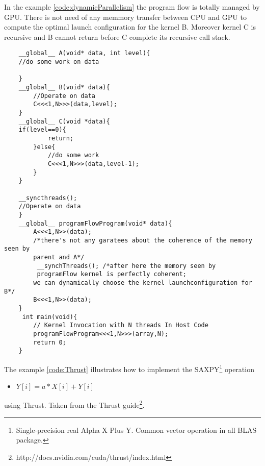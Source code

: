  In the example \ref{code:dynamicParallelism} the program flow is totally
 managed by GPU. There is not need of any memmory transfer between CPU and GPU
 to compute the optimal launch configuration for the kernel B.
 Moreover kernel C is  recursive and B cannot return before C complete
 its recursive call stack.
    \begin{lstlisting}
	__global__ A(void* data, int level){
	//do some work on data
		
	}
	__global__ B(void* data){
		//Operate on data
		C<<<1,N>>>(data,level);
	}
	__global__ C(void *data){
	if(level==0){
			return;
		}else{
			//do some work
			C<<<1,N>>>(data,level-1);
		}
	}
	
	__syncthreads();
	//Operate on data
	}
	__global__ programFlowProgram(void* data){
		A<<<1,N>>(data);
		/*there's not any garatees about the coherence of the memory seen by
		parent and A*/
		 __synchThreads(); /*after here the memory seen by
		 programFlow kernel is perfectly coherent;
		we can dynamically choose the kernel launchconfiguration for B*/
		B<<<1,N>>(data);
	}
	 int main(void){
		// Kernel Invocation with N threads In Host Code
    	programFlowProgram<<<1,N>>>(array,N);
    	return 0;
   	}
    \end{lstlisting} 
    
    
    
     The example \ref{code:Thrust} illustrates how to implement the
     SAXPY\footnote{Single-precision real Alpha X Plus Y. Common vector
     operation in all BLAS package.} operation
	 \begin{itemize}
	   \item 	 \begin{math}Y[i] = a * X[i] + Y[i]\end{math} 
	 \end{itemize}
	  using Thrust. Taken from the Thrust
	  guide\footnote{http://docs.nvidia.com/cuda/thrust/index.html}.
	  
